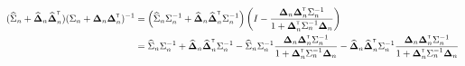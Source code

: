 \documentclass{article}
\def\spp{_{\text{PP}}}
\def\sat{_{\text{AT}}}
\newtheorem{assumption}{Assumption}
\begin{document}
\def\ddp{\bDelta_n\bDelta_n\trans}
\def\ddhp{\bDeltahat_n\bDeltahat_n\trans}
\def\dsd{\bDelta_n\trans\Sigma_n\inv\bDelta_n}
\begin{align*}
    (\Sigmahat_n + \ddhp)(\Sigma_n + \ddp)\inv &= \left(\Sigmahat_n\Sigma_n\inv + \ddhp\Sigma_n\inv\right)\left(I - \frac{ \ddp\Sigma_n\inv}{1 +\dsd}\right)\\
    &= \Sigmahat_n\Sigma_n\inv +\ddhp\Sigma_n\inv - \Sigmahat_n\Sigma_n\inv\frac{ \ddp\Sigma_n\inv}{1 +\dsd} - \ddhp\Sigma_n\inv\frac{ \ddp\Sigma_n\inv}{1 +\dsd}
\end{align*}





\end{document}
